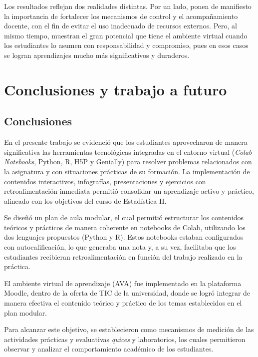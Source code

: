\documentclass[letter,oneside,12pt,spanish]{report}
\begin{document}
Los resultados reflejan dos realidades distintas. Por un lado, ponen de manifiesto la importancia de fortalecer los mecanismos de control y el acompañamiento docente, con el fin de evitar el uso inadecuado de recursos externos. Pero, al mismo tiempo, muestran el gran potencial que tiene el ambiente virtual cuando los estudiantes lo asumen con responsabilidad y compromiso, pues en esos casos se logran aprendizajes mucho más significativos y duraderos.

\newpage

\chapter{Conclusiones y trabajo a futuro}

\section{Conclusiones}

En el presente trabajo se evidenció que los estudiantes aprovecharon de manera significativa las herramientas tecnológicas integradas en el entorno virtual (\textit{Colab Notebooks}, Python, R, H5P y Genially) para resolver problemas relacionados con la asignatura y con situaciones prácticas de su formación. La implementación de contenidos interactivos, infografías, presentaciones y ejercicios con retroalimentación inmediata permitió consolidar un aprendizaje activo y práctico, alineado con los objetivos del curso de Estadística II.

Se diseñó un plan de aula modular, el cual permitió estructurar los contenidos teóricos y prácticos de manera coherente en notebooks de Colab, utilizando los dos lenguajes propuestos (Python y R). Estos notebooks estaban configurados con autocalificación, lo que generaba una nota y, a su vez, facilitaba que los estudiantes recibieran retroalimentación en función del trabajo realizado en la práctica.

El ambiente virtual de aprendizaje (AVA) fue implementado en la plataforma Moodle, dentro de la oferta de TIC de la universidad, donde se logró integrar de manera efectiva el contenido teórico y práctico de los temas establecidos en el plan modular.

Para alcanzar este objetivo, se establecieron como mecanismos de medición de las actividades prácticas y evaluativas \textit{quices} y laboratorios, los cuales permitieron observar y analizar el comportamiento académico de los estudiantes.
\end{document}
